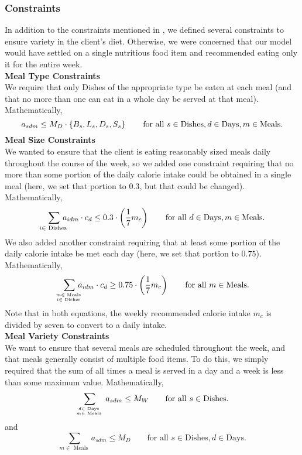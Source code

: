 \documentclass[twoside]{article}
\begin{document}
\subsubsection{Constraints}
In addition to the constraints mentioned in , we defined several constraints to ensure variety in the client's diet. Otherwise, we were concerned that our model would have settled on a single nutritious food item and recommended eating only it for the entire week.\\[.1in]
\textbf{Meal Type Constraints}\\[.1in]
We require that only Dishes of the appropriate type be eaten at each meal (and that no more than one can eat in a whole day be served at that meal). Mathematically,
\begin{equation*}
    a_{sdm} \leq M_D \cdot \cbr{B_s, L_s, D_s, S_s} \qquad \text{for all } s \in \text{Dishes}, d \in \text{Days}, m \in \text{Meals}.
\end{equation*}
\textbf{Meal Size Constraints}\\[.1in]
We wanted to ensure that the client is eating reasonably sized meals daily throughout the course of the week, so we added one constraint requiring that no more than some portion of the daily calorie intake could be obtained in a single meal (here, we set that portion to $0.3$, but that could be changed). Mathematically,
\begin{equation*}
    \smashoperator[r]{\sum_{i \in \text{ Dishes }}}\thinspace a_{idm} \cdot c_d \leq 0.3 \cdot \del{\dfrac 17 m_c} \qquad \text{for all } d \in \text{Days}, m \in \text{Meals}.
\end{equation*}
We also added another constraint requiring that at least some portion of the daily calorie intake be met each day (here, we set that portion to $0.75$). Mathematically,
\begin{equation*}
    \smashoperator[r]{\sum_{m \in \text{ Meals } \atop i \in \text{ Dishes }}}\thinspace a_{idm} \cdot c_d \geq 0.75 \cdot \del{\dfrac 17 m_c} \qquad \text{for all } m \in \text{Meals}.
\end{equation*}
Note that in both equations, the weekly recommended calorie intake $m_c$ is divided by seven to convert to a daily intake.\\[.1in]
\textbf{Meal Variety Constraints}\\[.1in]
We want to ensure that several meals are scheduled throughout the week, and that meals generally consist of multiple food items. To do this, we simply required that the sum of all times a meal is served in a day and a week is less than some maximum value. Mathematically,
\begin{equation*}
    \sum_{d \in \text{ Days } \atop m \in \text{ Meals }} a_{sdm} \leq M_W \qquad \text{for all } s \in \text{Dishes}.
\end{equation*}
and
\begin{equation*}
    \sum_{m \in \text{ Meals }} a_{sdm} \leq M_D \qquad \text{for all } s \in \text{Dishes}, d \in \text{Days}.
\end{equation*}
\end{document}
